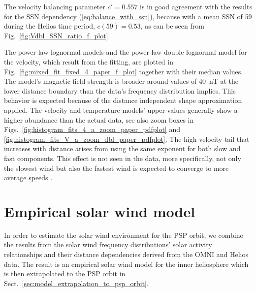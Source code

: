 \documentclass[]{aa}
\begin{document}
	The velocity balancing parameter $c' = 0.557$ is in good agreement with the results for the SSN dependency (\ref{eq:balance_with_ssn}), because with a mean SSN of 59 during the Helios time period, $c(59) = 0.53$, as can be seen from Fig.~\ref{fig:Vdbl_SSN_ratio_f_plot}.

	The power law lognormal models and the power law double lognormal model for the velocity, which result from the fitting, are plotted in Fig.~\ref{fig:mixed_fit_fixed_4_paper_f_plot} together with their median values. The model’s magnetic field strength is broader around values of \SI{40}{nT} at the lower distance boundary than the data's frequency distribution implies. This behavior is expected because of the distance independent shape approximation applied. The velocity and temperature models’ upper values generally show a higher abundance than the actual data, see also zoom boxes in Figs.~\ref{fig:histogram_fits_4_a_zoom_paper_pdfplot} and \ref{fig:histogram_fits_V_a_zoom_dbl_paper_pdfplot}. The high velocity tail that increases with distance arises from using the same exponent for both slow and fast components. This effect is not seen in the data, more specifically, not only the slowest wind but also the fastest wind is expected to converge to more average speeds \citep{Sanchez-Diaz2016}.

	\section{Empirical solar wind model}
	\label{sec:empirical_solar_wind_model}
	In order to estimate the solar wind environment for the PSP orbit, we combine the results from the solar wind frequency distributions’ solar activity relationships and their distance dependencies derived from the OMNI and Helios data. The result is an empirical solar wind model for the inner heliosphere which is then extrapolated to the PSP orbit in Sect.~\ref{sec:model_extrapolation_to_psp_orbit}.
\end{document}
